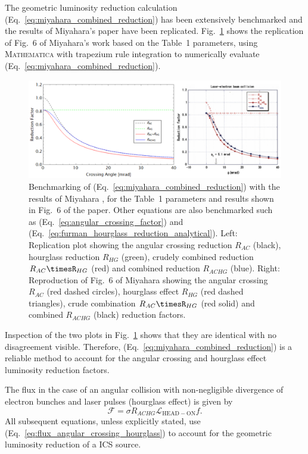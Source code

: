 \documentclass[../main.tex]{subfiles}
\begin{document}
The geometric luminosity reduction calculation (Eq.~\ref{eq:miyahara_combined_reduction}) has been extensively benchmarked and the results of Miyahara's paper \cite{miyahara2008luminosity} have been replicated. Fig.~\ref{fig:miyahara_benchmarking} shows the replication of Fig.~6 of Miyahara's work \cite{miyahara2008luminosity} based on the Table~1 parameters, using \textsc{Mathematica} with trapezium rule integration to numerically evaluate (Eq.~\ref{eq:miyahara_combined_reduction}).
\begin{figure}[!h]
\centering
\includegraphics[width=\textwidth]{Figures/Photon_Production_by_Inverse_Compton_Scattering/miyahara_benchmarking.pdf}
\caption{Benchmarking of (Eq.~\ref{eq:miyahara_combined_reduction}) with the results of Miyahara \cite{miyahara2008luminosity}, for the Table~1 parameters and results shown in Fig.~6 of the paper. Other equations are also benchmarked such as (Eq.~\ref{eq:angular_crossing_factor}) and (Eq.~\ref{eq:furman_hourglass_reduction_analytical}). Left: Replication plot showing the angular crossing reduction $R_{AC}$ (black), hourglass reduction $R_{HG}$ (green), crudely combined reduction $R_{AC}\timesR_{HG}$ (red) and combined reduction $R_{ACHG}$ (blue). Right: Reproduction of Fig.~6 of Miyahara \cite{miyahara2008luminosity} showing the angular crossing $R_{AC}$ (red dashed circles), hourglass effect $R_{HG}$ (red dashed triangles), crude combination $R_{AC}\timesR_{HG}$ (red solid) and combined $R_{ACHG}$ (black) reduction factors.}
\label{fig:miyahara_benchmarking}
\end{figure}
Inspection of the two plots in Fig.~\ref{fig:miyahara_benchmarking} shows that they are identical with no disagreement visible. Therefore, (Eq.~\ref{eq:miyahara_combined_reduction}) is a reliable method to account for the angular crossing and hourglass effect luminosity reduction factors. 

The flux in the case of an angular collision with non-negligible divergence of electron bunches and laser pulses (hourglass effect) is given by
\begin{equation}
\mathcal{F} = \sigma R_{ACHG}\mathcal{L}_{\mathrm{HEAD-ON}}f.
\label{eq:flux_angular_crossing_hourglass}
\end{equation}
All subsequent equations, unless explicitly stated, use (Eq.~\ref{eq:flux_angular_crossing_hourglass}) to account for the geometric luminosity reduction of a ICS source.
\end{document}
